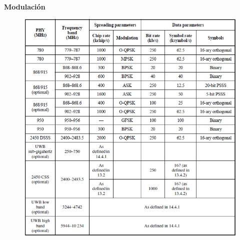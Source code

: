 \documentclass[aspectratio=169]{beamer}
\begin{document}
\begin{frame}{\textbf{Modulación}}
\begin{minipage}[c]{1.0\linewidth}
\begin{figure}[H]
	\includegraphics[width=1\textwidth]{./imagenes/modulaciones.jpg}
		\end{figure}	
\end{minipage}
\end{frame}
\end{document}
